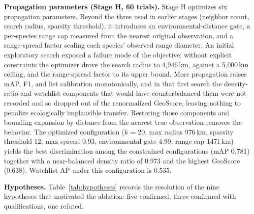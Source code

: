 \textbf{Propagation parameters (Stage H, 60 trials).} Stage H optimizes six propagation parameters. Beyond the three used in earlier stages (neighbor count, search radius, sparsity threshold), it introduces an environmental-distance gate, a per-species range cap measured from the nearest original observation, and a range-spread factor scaling each species' observed range diameter. An initial exploratory search exposed a failure mode of the objective: without explicit constraints the optimizer drove the search radius to 4,946\,km, against a 5,000\,km ceiling, and the range-spread factor to its upper bound. More propagation raises mAP, F1, and list calibration monotonically, and in that first search the density-ratio and watchlist components that would have counterbalanced them were not recorded and so dropped out of the renormalized GeoScore, leaving nothing to penalize ecologically implausible transfer. Restoring those components and bounding expansion by distance from the nearest true observation removes the behavior. The optimized configuration ($k$ = 20, max radius 976\,km, sparsity threshold 12, max spread 0.93, environmental gate 4.99, range cap 1471\,km) yields the best discrimination among the constrained configurations (mAP 0.781) together with a near-balanced density ratio of 0.973 and the highest GeoScore (0.638). Watchlist AP under this configuration is 0.535.

\textbf{Hypotheses.} Table~\ref{tab:hypotheses} records the resolution of the nine hypotheses that motivated the ablation: five confirmed, three confirmed with qualifications, one refuted.

